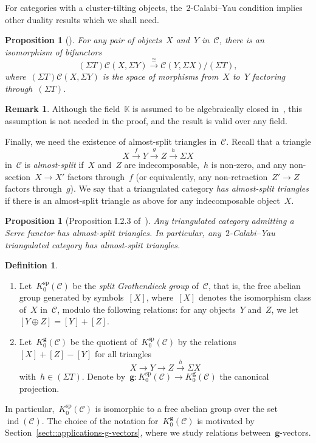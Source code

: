 \documentclass{amsart}
\newtheorem{proposition}[theorem]{Proposition}
\theoremstyle{definition}
\newtheorem{definition}[theorem]{Definition}
\newtheorem{remark}[theorem]{Remark}
\renewcommand{\b}[1]{{\boldsymbol{#1}}} %
\newcommand{\darkblue}{\color{darkblue}} %
\newcommand{\defn}[1]{\textsl{\darkblue #1}} %
\newcommand{\field}{\mathbb{K}}
\newcommand{\cat}{\mathcal{C}}
\newcommand{\susp}{\Sigma}
\newcommand{\spl}{\operatorname{sp}}
\newcommand{\Ksp}{K_0^{\spl}}
\newcommand{\Kg}{K_0^{\b{g}}}
\newcommand{\ind}{\operatorname{ind}}
\begin{document}
For categories with a cluster-tilting objects, the~$2$-Calabi--Yau condition implies other duality results which we shall need.

\begin{proposition}[\cite{Palu}]
 For any pair of objects~$X$ and~$Y$ in~$\cat$, there is an isomorphism of bifunctors
 \[
  (\susp T)\cat(X, \susp Y) \xrightarrow{\cong} \cat(Y, \susp X)/(\susp T),
 \]
 where~$(\susp T)\cat(X, \susp Y)$ is the space of morphisms from~$X$ to~$Y$ factoring through~$(\susp T)$.
\end{proposition}

\begin{remark}
 Although the field~$\field$ is assumed to be algebraically closed in~\cite{Palu}, this assumption is not needed in the proof, and the result is valid over any field.
\end{remark}

Finally, we need the existence of almost-split triangles in~$\cat$.  Recall that a triangle
\[
 X\xrightarrow{f} Y \xrightarrow{g} Z \xrightarrow{h} \susp X
\]
in~$\cat$ is \defn{almost-split} if~$X$ and~$Z$ are indecomposable,~$h$ is non-zero, and any non-section~$X\to X'$ factors through~$f$  (or equivalently, any non-retraction~$Z'\to Z$ factors through~$g$).  We say that a triangulated category \defn{has almost-split triangles} if there is an almost-split triangle as above for any indecomposable object~$X$. 

\begin{proposition}[Proposition I.2.3 of~\cite{ReitenVandenbergh}]
 Any triangulated category admitting a Serre functor has almost-split triangles.  In particular, any~$2$-Calabi--Yau triangulated category has almost-split triangles.
\end{proposition}

\begin{definition}\label{defi::grothendieck-group}
 \begin{enumerate}
  \item Let~$\Ksp(\cat)$ be the \defn{split Grothendieck group} of~$\cat$, that is, the free abelian group generated by symbols~$[X]$, where~$[X]$ denotes the isomorphism class of~$X$ in~$\cat$, modulo the following relations: for any objects~$Y$ and~$Z$, we let~$[Y\oplus Z] = [Y] + [Z]$. 
  
  \item Let~$\Kg(\cat)$ be the quotient of~$\Ksp(\cat)$ by the relations~$[X]+[Z]-[Y]$ for all triangles
  \[
   X\xrightarrow{} Y \xrightarrow{} Z \xrightarrow{h} \susp X
  \]
  with~$h\in (\susp T)$.  Denote by~$\b g:\Ksp(\cat) \to \Kg(\cat)$ the canonical projection.

 \end{enumerate}

 
\end{definition}
In particular,~$\Ksp(\cat)$ is isomorphic to a free abelian group over the set~$\ind(\cat)$.  The choice of the notation for~$\Kg(\cat)$ is motivated by Section~\ref{sect::applications-g-vectors}, where we study relations between~$\b g$-vectors.
\end{document}
